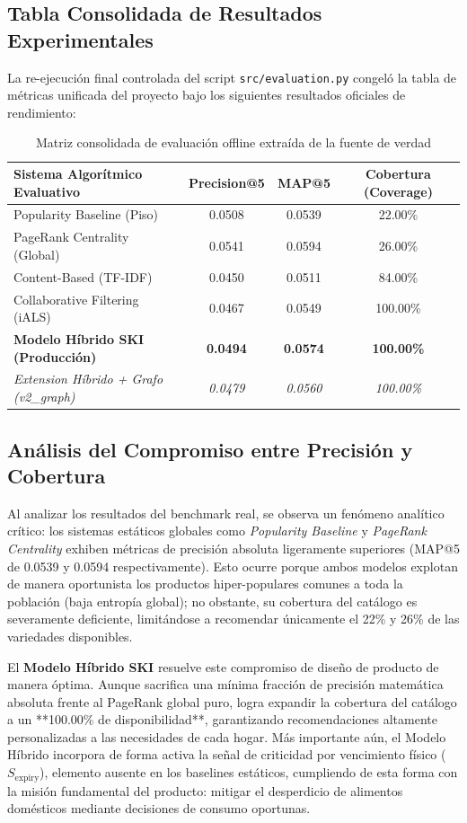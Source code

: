 \documentclass[11pt,a4paper]{article}
\begin{document}
\subsection{Tabla Consolidada de Resultados Experimentales}
La re-ejecución final controlada del script \texttt{src/evaluation.py} congeló la tabla de métricas unificada del proyecto bajo los siguientes resultados oficiales de rendimiento:

\begin{table}[h!]
\centering
\small
\caption{Matriz consolidada de evaluación offline extraída de la fuente de verdad}
\vspace{0.2cm}
\begin{tabular}{lccc}
\toprule
\textbf{Sistema Algorítmico Evaluativo} & \textbf{Precision@5} & \textbf{MAP@5} & \textbf{Cobertura (Coverage)} \\
\midrule
Popularity Baseline (Piso) & 0.0508 & 0.0539 & 22.00\% \\
PageRank Centrality (Global) & 0.0541 & 0.0594 & 26.00\% \\
Content-Based (TF-IDF) & 0.0450 & 0.0511 & 84.00\% \\
Collaborative Filtering (iALS) & 0.0467 & 0.0549 & 100.00\% \\
\textbf{Modelo Híbrido SKI (Producción)} & \textbf{0.0494} & \textbf{0.0574} & \textbf{100.00\%} \\
\midrule
\textit{Extension Híbrido + Grafo (v2\_graph)} & \textit{0.0479} & \textit{0.0560} & \textit{100.00\%} \\
\bottomrule
\end{tabular}
\end{table}

\subsection{Análisis del Compromiso entre Precisión y Cobertura}
Al analizar los resultados del benchmark real, se observa un fenómeno analítico crítico: los sistemas estáticos globales como \textit{Popularity Baseline} y \textit{PageRank Centrality} exhiben métricas de precisión absoluta ligeramente superiores (MAP@5 de 0.0539 y 0.0594 respectivamente). Esto ocurre porque ambos modelos explotan de manera oportunista los productos hiper-populares comunes a toda la población (baja entropía global); no obstante, su cobertura del catálogo es severamente deficiente, limitándose a recomendar únicamente el 22\% y 26\% de las variedades disponibles.

El \textbf{Modelo Híbrido SKI} resuelve este compromiso de diseño de producto de manera óptima. Aunque sacrifica una mínima fracción de precisión matemática absoluta frente al PageRank global puro, logra expandir la cobertura del catálogo a un **100.00\% de disponibilidad**, garantizando recomendaciones altamente personalizadas a las necesidades de cada hogar. Más importante aún, el Modelo Híbrido incorpora de forma activa la señal de criticidad por vencimiento físico ($S_{\text{expiry}}$), elemento ausente en los baselines estáticos, cumpliendo de esta forma con la misión fundamental del producto: mitigar el desperdicio de alimentos domésticos mediante decisiones de consumo oportunas.
\end{document}
